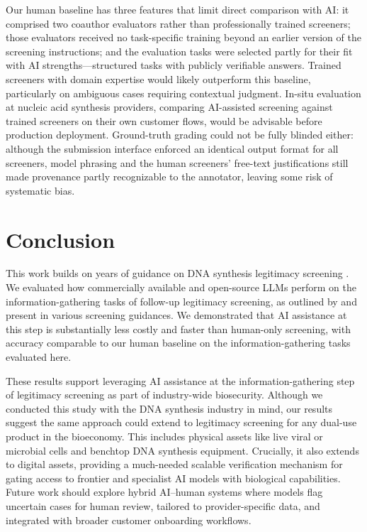\documentclass[12pt]{article}
\begin{document}
Our human baseline has three features that limit direct comparison with AI: it comprised two coauthor evaluators rather than professionally trained screeners; those evaluators received no task-specific training beyond an earlier version of the screening instructions; and the evaluation tasks were selected partly for their fit with AI strengths---structured tasks with publicly verifiable answers. Trained screeners with domain expertise would likely outperform this baseline, particularly on ambiguous cases requiring contextual judgment. In-situ evaluation at nucleic acid synthesis providers, comparing AI-assisted screening against trained screeners on their own customer flows, would be advisable before production deployment. Ground-truth grading could not be fully blinded either: although the submission interface enforced an identical output format for all screeners, model phrasing and the human screeners' free-text justifications still made provenance partly recognizable to the annotator, leaving some risk of systematic bias.

\section{Conclusion}

This work builds on years of guidance on DNA synthesis legitimacy screening \citep{CarterFriedman2015, Alexanian2024, IGSC2024}. We evaluated how commercially available and open-source LLMs perform on the information-gathering tasks of follow-up legitimacy screening, as outlined by \citet{Alexanian2024} and present in various screening guidances. We demonstrated that AI assistance at this step is substantially less costly and faster than human-only screening, with accuracy comparable to our human baseline on the information-gathering tasks evaluated here.

These results support leveraging AI assistance at the information-gathering step of legitimacy screening as part of industry-wide biosecurity. Although we conducted this study with the DNA synthesis industry in mind, our results suggest the same approach could extend to legitimacy screening for any dual-use product in the bioeconomy. This includes physical assets like live viral or microbial cells and benchtop DNA synthesis equipment. Crucially, it also extends to digital assets, providing a much-needed scalable verification mechanism for gating access to frontier and specialist AI models with biological capabilities. Future work should explore hybrid AI--human systems where models flag uncertain cases for human review, tailored to provider-specific data, and integrated with broader customer onboarding workflows.
\end{document}
